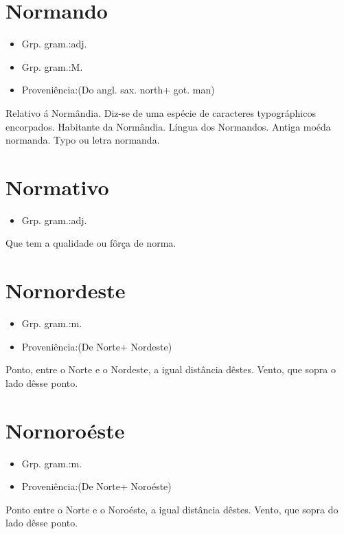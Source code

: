 \section{Normando}
\begin{itemize}
\item {Grp. gram.:adj.}
\end{itemize}
\begin{itemize}
\item {Grp. gram.:M.}
\end{itemize}
\begin{itemize}
\item {Proveniência:(Do angl. sax. \textunderscore north\textunderscore  + got. \textunderscore man\textunderscore )}
\end{itemize}
Relativo á Normândia.
Diz-se de uma espécie de caracteres typográphicos encorpados.
Habitante da Normândia.
Língua dos Normandos.
Antiga moéda normanda.
Typo ou letra normanda.
\section{Normativo}
\begin{itemize}
\item {Grp. gram.:adj.}
\end{itemize}
Que tem a qualidade ou fôrça de norma.
\section{Nornordeste}
\begin{itemize}
\item {Grp. gram.:m.}
\end{itemize}
\begin{itemize}
\item {Proveniência:(De \textunderscore Norte\textunderscore  + \textunderscore Nordeste\textunderscore )}
\end{itemize}
Ponto, entre o Norte e o Nordeste, a igual distância dêstes.
Vento, que sopra o lado dêsse ponto.
\section{Nornoroéste}
\begin{itemize}
\item {Grp. gram.:m.}
\end{itemize}
\begin{itemize}
\item {Proveniência:(De \textunderscore Norte\textunderscore  + \textunderscore Noroéste\textunderscore )}
\end{itemize}
Ponto entre o Norte e o Noroéste, a igual distância dêstes.
Vento, que sopra do lado dêsse ponto.
